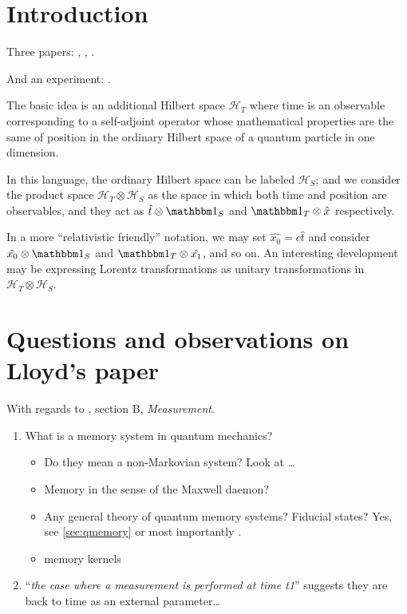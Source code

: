 \section{Introduction}

Three papers: \cite{Lloyd:Time}, \cite{Marletto:Evolution}, \cite{Prvanovic}.

And an experiment: \cite{Moreva:synthetic,Moreva:illustration}.

The basic idea is an additional Hilbert space $\mathcal{H}_T$ where time is an observable
corresponding to
a self-adjoint operator whose mathematical properties are the same of position in the
ordinary Hilbert space of a quantum particle in one dimension.

In this language, the ordinary Hilbert space can be labeled $\mathcal{H}_S$;
and we consider the product space $\mathcal{H}_T \otimes \mathcal{H}_S$ as
the space in which both time and position are observables, and they act as
$\hat{t} \otimes \idop_S$ and $\idop_T \otimes \hat{x}$
respectively.

\begin{remark}
  In a more ``relativistic friendly'' notation, we may set
  $\hat{x_0} = c\hat{t}$ and consider
  $\hat{x_0} \otimes \idop_S$ and $\idop_T \otimes \hat{x_1}$,
  and so on. An interesting development may be expressing
  Lorentz transformations as unitary transformations in
  $\mathcal{H}_T \otimes \mathcal{H}_S$.
\end{remark}

\section{Questions and observations on Lloyd's paper}

With regards to \cite{Lloyd:Time}, section B, \textit{Measurement}.

\begin{enumerate}
  \item What is a memory system in quantum mechanics? 
  \begin{itemize}
    \item Do they mean a non-Markovian system? Look at \cite{MeasurementMarkovian}\dots
    \item Memory in the sense of the Maxwell daemon?
    \item
      Any general theory of quantum memory systems? Fiducial states?
      Yes, see \ref{sec:qmemory} or most importantly \cite[Ch.~3]{PreskillNotes}.
    \item memory kernels \cite{CarmichaelOQS2017}
  \end{itemize}
  \item ``\emph{the case where a measurement is performed at time t1}'' suggests they are back to time as an external parameter\dots
\end{enumerate}

